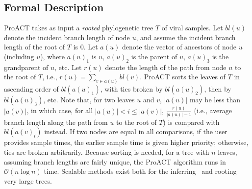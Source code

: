 \documentclass[a4paper,10pt]{article}
\newcommand{\bigO}{\mathcal{O}}
\newcommand{\PLWH}{sample\xspace}
\newcommand{\D}{D}
\newcommand{\ta}[1][A]{t'}
\newcommand{\tb}{t'}
\begin{document}
\subsection{Formal Description}
ProACT takes as input a {\em rooted} phylogenetic tree $T$ of viral samples. %
Let $bl(u)$ denote the incident branch length of node $u$,
and assume the incident branch length of the root of $T$ is 0.
Let $a(u)$ denote the vector of ancestors of node $u$ (including $u$),
where $a(u)_1$ is $u$,
$a(u)_2$ is the parent of $u$,
$a(u)_3$ is the grandparent of $u$, etc.
Let $r(u)$ denote the length of the path from node $u$ to the root of $T$,
i.e., $r(u)=\sum_{v\in a(u)}{bl(v)}$.
ProACT sorts the leaves of $T$ in ascending order of $bl(a(u)_1)$,
with ties broken by $bl(a(u)_2)$, then by $bl(a(u)_3)$, etc.
Note that, for two leaves $u$ and $v$,
$|a(u)|$ may be less than $|a(v)|$,
in which case, for all $|a(u)|<i\le|a(v)|$,
$\frac{r(u)}{|a(u)|-1}$ (i.e., average branch length along the path from $u$ to the root of $T$) is compared with $bl(a(v)_i)$ instead.
If two nodes are equal in all comparisons, if the user provides sample times, the earlier sample time is given higher priority; otherwise, ties are broken arbitrarily.
Because sorting is needed, for a tree with $n$ leaves,
assuming branch lengths are fairly unique,
the ProACT algorithm runs in $\bigO(n\log n)$ time. Scalable methods exist both for the inferring~\citep[e.g.][]{Price2010,Nguyen2015} and rooting~\citep[e.g.][]{Mai2017} very large trees.

\end{document}
